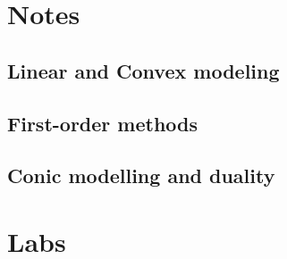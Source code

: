 






\tableofcontents
\newpage
{}

\part{Notes}

\chapter{Linear and Convex modeling}	
\label{Ch1}
	





	
\chapter{First-order methods}
\label{Ch2}

	

	

	
	
\chapter{Conic modelling and duality}

	

	

	

	
	
	
	


\part{Labs}



	
	







